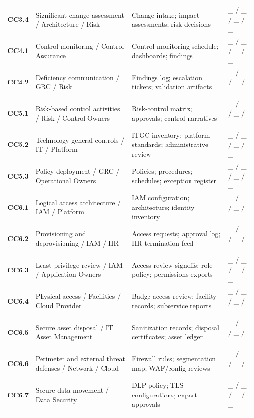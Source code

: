 \documentclass[10pt,oneside]{report}
\begin{document}
\begin{longtable}{@{}p{0.63in}p{2.13in}p{2.28in}p{0.92in}@{}}
\textbf{CC3.4} & Significant change assessment / Architecture / Risk & Change intake; impact assessments; risk decisions & \_ / \_ / \_ / \_ \\
\addlinespace[3pt]
\textbf{CC4.1} & Control monitoring / Control Assurance & Control monitoring schedule; dashboards; findings & \_ / \_ / \_ / \_ \\
\addlinespace[3pt]
\textbf{CC4.2} & Deficiency communication / GRC / Risk & Findings log; escalation tickets; validation artifacts & \_ / \_ / \_ / \_ \\
\addlinespace[3pt]
\textbf{CC5.1} & Risk-based control activities / Risk / Control Owners & Risk-control matrix; approvals; control narratives & \_ / \_ / \_ / \_ \\
\addlinespace[3pt]
\textbf{CC5.2} & Technology general controls / IT / Platform & ITGC inventory; platform standards; administrative review & \_ / \_ / \_ / \_ \\
\addlinespace[3pt]
\textbf{CC5.3} & Policy deployment / GRC / Operational Owners & Policies; procedures; schedules; exception register & \_ / \_ / \_ / \_ \\
\addlinespace[3pt]
\textbf{CC6.1} & Logical access architecture / IAM / Platform & IAM configuration; architecture; identity inventory & \_ / \_ / \_ / \_ \\
\addlinespace[3pt]
\textbf{CC6.2} & Provisioning and deprovisioning / IAM / HR & Access requests; approval log; HR termination feed & \_ / \_ / \_ / \_ \\
\addlinespace[3pt]
\textbf{CC6.3} & Least privilege review / IAM / Application Owners & Access review signoffs; role policy; permissions exports & \_ / \_ / \_ / \_ \\
\addlinespace[3pt]
\textbf{CC6.4} & Physical access / Facilities / Cloud Provider & Badge access review; facility records; subservice reports & \_ / \_ / \_ / \_ \\
\addlinespace[3pt]
\textbf{CC6.5} & Secure asset disposal / IT Asset Management & Sanitization records; disposal certificates; asset ledger & \_ / \_ / \_ / \_ \\
\addlinespace[3pt]
\textbf{CC6.6} & Perimeter and external threat defenses / Network / Cloud & Firewall rules; segmentation map; WAF/config reviews & \_ / \_ / \_ / \_ \\
\addlinespace[3pt]
\textbf{CC6.7} & Secure data movement / Data Security & DLP policy; TLS configurations; export approvals & \_ / \_ / \_ / \_ \\
\addlinespace[3pt]

\end{longtable}
\end{document}
